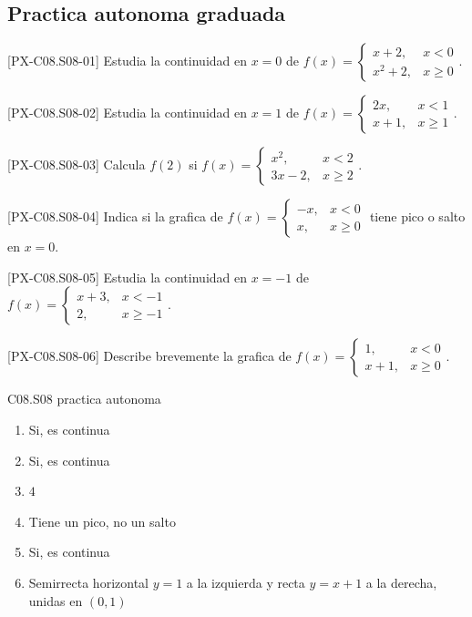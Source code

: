 \subsection*{Practica autonoma graduada}
\begin{exercise}{[PX-C08.S08-01] Estudia la continuidad en \(x=0\) de \(f(x)=\begin{cases}x+2,&x<0\\x^2+2,&x\geq0\end{cases}\).}
\end{exercise}
\begin{exercise}{[PX-C08.S08-02] Estudia la continuidad en \(x=1\) de \(f(x)=\begin{cases}2x,&x<1\\x+1,&x\geq1\end{cases}\).}
\end{exercise}
\begin{exercise}{[PX-C08.S08-03] Calcula \(f(2)\) si \(f(x)=\begin{cases}x^2,&x<2\\3x-2,&x\geq2\end{cases}\).}
\end{exercise}
\begin{exercise}{[PX-C08.S08-04] Indica si la grafica de \(f(x)=\begin{cases}-x,&x<0\\x,&x\geq0\end{cases}\) tiene pico o salto en \(x=0\).}
\end{exercise}
\begin{exercise}{[PX-C08.S08-05] Estudia la continuidad en \(x=-1\) de \(f(x)=\begin{cases}x+3,&x<-1\\2,&x\geq-1\end{cases}\).}
\end{exercise}
\begin{exercise}{[PX-C08.S08-06] Describe brevemente la grafica de \(f(x)=\begin{cases}1,&x<0\\x+1,&x\geq0\end{cases}\).}
\end{exercise}

\begin{shortanswer}{C08.S08 practica autonoma}
\begin{enumerate}[label=\textbf{PX-C08.S08-\arabic*:}, leftmargin=*]
  \item Si, es continua
  \item Si, es continua
  \item \(4\)
  \item Tiene un pico, no un salto
  \item Si, es continua
  \item Semirrecta horizontal \(y=1\) a la izquierda y recta \(y=x+1\) a la derecha, unidas en \((0,1)\)
\end{enumerate}
\end{shortanswer}

